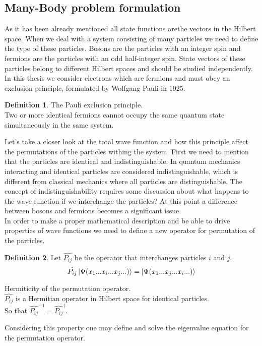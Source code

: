 \documentclass[twoside,english]{uiofysmaster}
\theoremstyle{definition}
\newtheorem{defn}{Definition}
\begin{document}
\subsection{Many-Body problem formulation}

As it has been already mentioned all state functions arethe  vectors in the Hilbert space. When we deal with a system consisting of many particles we need to define the type of these particles. Bosons are the particles with an integer spin and fermions are the particles with an odd half-integer spin. State vectors of these particles belong to different Hilbert spaces and should be studied independently. In this thesis we consider electrons which are fermions and must obey an exclusion principle, formulated by Wolfgang Pauli in 1925.
\begin{defn}The Pauli exclusion principle.\\
Two or more identical fermions cannot occupy the same quantum state simultaneously in the same system.
\end{defn}
Let's take a closer look at the total wave function and how this principle affect the permutations of the particles withing the system. First we need to mention that the particles are identical and indistinguishable. In quantum mechanics interacting and identical particles are considered indistinguishable, which is different from classical mechanics where all particles are distinguishable. The concept of indistinguishability requires some discussion about what happens to the wave function if we interchange the particles? At this point a difference between bosons and fermions becomes a significant issue. \\
In order to make a proper mathematical description and be able to drive properties of wave functions we need to define a new operator for permutation of the particles.\\
\begin{defn}\label{denf:permutation}
Let $\hat{P_{ij}}$ be the operator that interchanges particles $i$ and $j$. 
\[\hat{P_{ij}} \ket{ \Psi(x_1 ... x_i ... x_j ...) }=\ket{ \Psi(x_1 ... x_j ... x_i ...) } \]
\end{defn}
\begin{theorem} Hermiticity of the permutation operator.\\
	$\hat{P_{ij}}$ is a Hermitian operator in Hilbert space for identical particles.\\
	So that $\hat{P_{ij}}^{-1}=\hat{P_{ij}}^\dagger$.
\end{theorem}
Considering this property one may define and solve the eigenvalue equation for the permutation operator.
\end{document}
